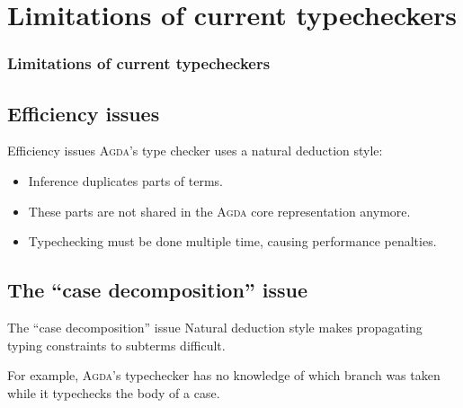 \documentclass[xcolor=svgnames,11pt]{beamer}
\newcommand{\agda}{\textsc{Agda}\xspace}
\begin{document}
\section{Limitations of current typecheckers}
\begin{frame}
  \frametitle{Limitations of current typecheckers}
  \tableofcontents[currentsection]
\end{frame}

\subsection{Efficiency issues}
\begin{frame}{Efficiency issues}
  \agda's type checker uses a natural deduction style:
  \begin{itemize}
  \item Inference duplicates parts of terms.
  \item These parts are not shared in the \agda core representation anymore.
  \item Typechecking must be done multiple time, causing performance penalties.
  \end{itemize}
  \pause
  \begin{figure}
    \centering
  \end{figure}
\end{frame}

\subsection{The ``case decomposition'' issue}
\begin{frame}{The ``case decomposition'' issue}
  Natural deduction style makes propagating typing constraints to subterms difficult.

  For example, \agda's typechecker has no knowledge of which branch was taken while it typechecks the body of a case.
  \begin{center}
    \begin{minipage}{0.9\textwidth}
      
    \end{minipage}
  \end{center}
\end{frame}
\end{document}
